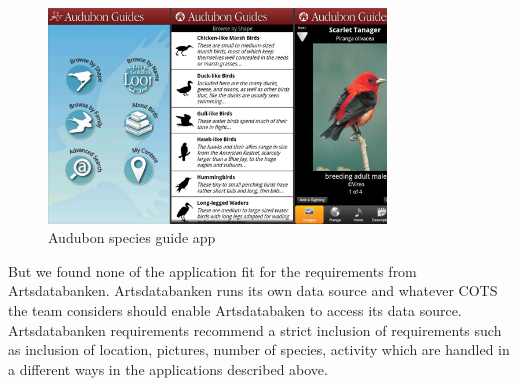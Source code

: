 \begin{figure}[htb]
    \centering
    \includegraphics[width=0.8\textwidth]{introduction/project_description/AudubonGuide.png}
    \caption{Audubon species guide app}
    \label{fig:audubonapp}
\end{figure}

But we found none of the application fit for the requirements from Artsdatabanken. Artsdatabanken runs its own data source and whatever COTS the team considers should enable Artsdatabaken to access its data source. Artsdatabanken requirements recommend a strict inclusion of requirements such as inclusion of location, pictures, number of species, activity which are handled in a different ways in the applications described above.  